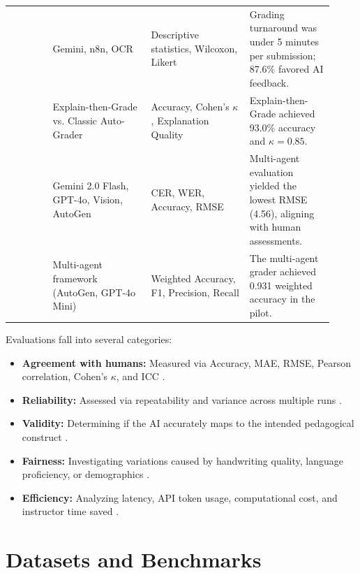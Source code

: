 \documentclass[11pt,a4paper]{article}
\begin{document}
\begin{longtable}{p{0.12\linewidth} p{0.28\linewidth} p{0.28\linewidth} p{0.24\linewidth}}
\addlinespace

\cite{P011} & Gemini, n8n, OCR &
Descriptive statistics, Wilcoxon, Likert &
Grading turnaround was under 5 minutes per submission; 87.6\% favored AI feedback. \\

\addlinespace

\cite{P012} & Explain-then-Grade vs. Classic Auto-Grader &
Accuracy, Cohen's $\kappa$, Explanation Quality &
Explain-then-Grade achieved 93.0\% accuracy and $\kappa = 0.85$. \\

\addlinespace

\cite{P021} & Gemini 2.0 Flash, GPT-4o, Vision, AutoGen &
CER, WER, Accuracy, RMSE &
Multi-agent evaluation yielded the lowest RMSE (4.56), aligning with human assessments. \\

\addlinespace

\cite{P027} & Multi-agent framework (AutoGen, GPT-4o Mini) &
Weighted Accuracy, F1, Precision, Recall &
The multi-agent grader achieved 0.931 weighted accuracy in the pilot. \\

\end{longtable}

Evaluations fall into several categories:
\begin{itemize}
    \item \textbf{Agreement with humans:} Measured via Accuracy, MAE, RMSE, Pearson correlation, Cohen's $\kappa$, and ICC \cite{P001, P003, P008, P014}.
    \item \textbf{Reliability:} Assessed via repeatability and variance across multiple runs \cite{P010, P012, P025}.
    \item \textbf{Validity:} Determining if the AI accurately maps to the intended pedagogical construct \cite{P002, P014}.
    \item \textbf{Fairness:} Investigating variations caused by handwriting quality, language proficiency, or demographics \cite{P019, P029}.
    \item \textbf{Efficiency:} Analyzing latency, API token usage, computational cost, and instructor time saved \cite{P006, P011, P012}.
\end{itemize}

\section{Datasets and Benchmarks}
\end{document}
